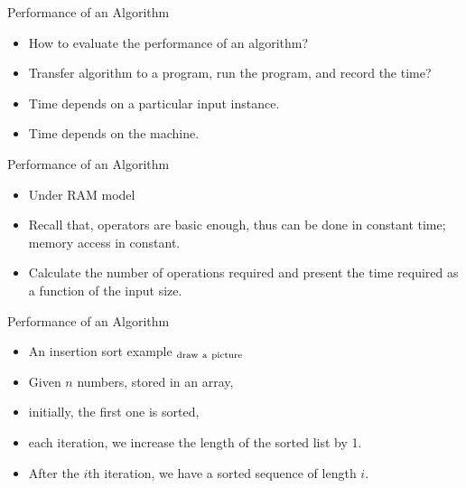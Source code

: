\documentclass{beamer}
\begin{document}
\begin{frame}{}
\begin{center}
Performance of an Algorithm
\end{center}
\begin{itemize}
\item How to evaluate the performance of an algorithm?
\item Transfer algorithm to a program, run the program, and record the time?
\item Time depends on a particular input instance.
\item Time depends on the machine.  
\end{itemize}
\end{frame}

\begin{frame}{}
\begin{center}
Performance of an Algorithm
\end{center}
\begin{itemize}
\item Under RAM model
\item Recall that, operators are basic enough, thus can be done in constant
 time; memory access in constant.
\item Calculate the number of operations required and present the time
 required as a function of the input size.  
\end{itemize}
\end{frame}


\begin{frame}{}
\begin{center}
Performance of an Algorithm
\end{center}
\begin{itemize}
\item An insertion sort example $_{\rm draw\ a\ picture}$
\item Given $n$ numbers, stored in an array,
\item initially, the first one is sorted,
\item each iteration, we increase the length of the sorted list by 1.  
\item After the $i$th iteration, we have a sorted sequence of length $i$.  
\end{itemize}
\end{frame}
\end{document}
